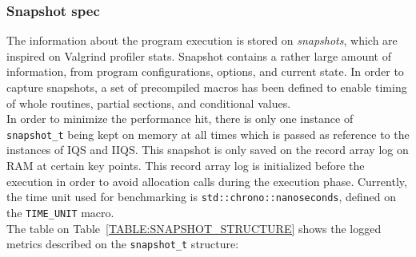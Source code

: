 \subsubsection{Snapshot spec}
The information about the program execution is stored on \textit{snapshots}, which are inspired on Valgrind profiler stats. Snapshot contains a rather large amount of information, from program configurations, options, and current state. In order to capture snapshots, a set of precompiled macros has been defined to enable timing of whole routines, partial sections, and conditional values. \\

In order to minimize the performance hit, there is only one instance of \texttt{snapshot\_t} being kept on memory at all times which is passed as reference to the instances of IQS and IIQS. This snapshot is only saved on the record array log on RAM at certain key points. This record array log is initialized before the execution in order to avoid allocation calls during the execution phase. Currently, the time unit used for benchmarking is \texttt{std::chrono::nanoseconds}, defined on the \texttt{TIME\_UNIT} macro.\\

The table on Table~\ref{TABLE:SNAPSHOT_STRUCTURE} shows the logged metrics described on the \texttt{snapshot\_t} structure:\\

